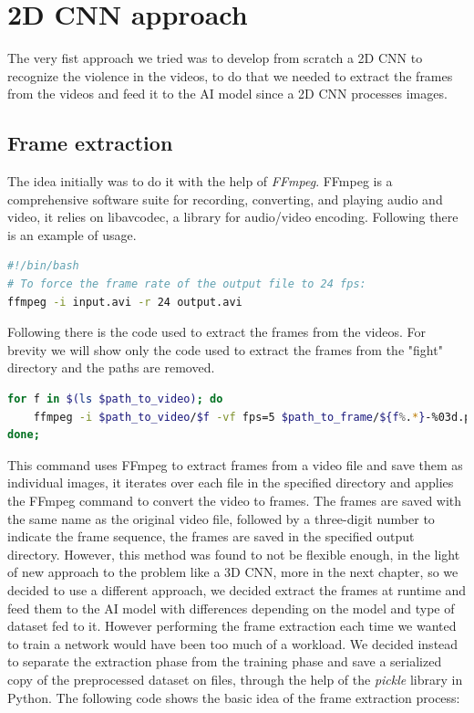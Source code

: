 \chapter{2D CNN approach}
The very fist approach we tried was to develop from scratch a 2D CNN to recognize the violence in the videos, to do that we needed to extract the frames from the videos and feed it to the AI model since a 2D CNN processes images.
\section{Frame extraction}
The idea initially was to do it with the help of \textit{FFmpeg}. FFmpeg is a comprehensive software suite for recording, converting, and playing audio and video, it relies on libavcodec, a library for audio/video encoding. Following there is an example of usage.
\begin{lstlisting}[language=bash, caption={FFmpeg example}, label={lst:FFmpegExample}]
#!/bin/bash
# To force the frame rate of the output file to 24 fps:
ffmpeg -i input.avi -r 24 output.avi

\end{lstlisting}

Following there is the code used to extract the frames from the videos. For brevity we will show only the code used to extract the frames from the "fight" directory and the paths are removed.
\begin{lstlisting}[language=bash, caption={Frame extraction}, label={lst:FrameExtraction}]
for f in $(ls $path_to_video); do 
	ffmpeg -i $path_to_video/$f -vf fps=5 $path_to_frame/${f%.*}-%03d.png; 
done;
\end{lstlisting}

This command uses FFmpeg to extract frames from a video file and save them as individual images, it iterates over each file in the specified directory and applies the FFmpeg command to convert the video to frames. The frames are saved with the same name as the original video file, followed by a three-digit number to indicate the frame sequence, the frames are saved in the specified output directory.
However, this method was found to not be flexible enough, in the light of new approach to the problem like a 3D CNN, more in the next chapter, so we decided to use a different approach, we decided extract the frames at runtime and feed them to the AI model with differences depending on the model and type of dataset fed to it. However performing the frame extraction each time we wanted to train a network would have been too much of a workload. We decided instead to separate the extraction phase from the training phase and save a serialized copy of the preprocessed dataset on files, through the help of the \textit{pickle} library in Python. The following code shows the basic idea of the frame extraction process:

